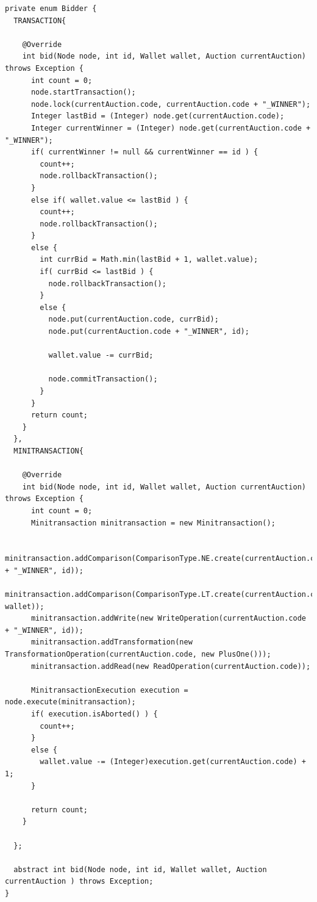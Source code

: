 \documentclass[11pt,twoside,a4paper]{book}
\begin{document}
\begin{lstlisting}[caption={Participante que efetuam os lances}, label=lst:bidder_auction]
private enum Bidder {
  TRANSACTION{

    @Override
    int bid(Node node, int id, Wallet wallet, Auction currentAuction) throws Exception {
      int count = 0;
      node.startTransaction();
      node.lock(currentAuction.code, currentAuction.code + "_WINNER");
      Integer lastBid = (Integer) node.get(currentAuction.code);
      Integer currentWinner = (Integer) node.get(currentAuction.code + "_WINNER");
      if( currentWinner != null && currentWinner == id ) {
        count++;
        node.rollbackTransaction();
      }
      else if( wallet.value <= lastBid ) {
        count++;
        node.rollbackTransaction();
      }
      else {
        int currBid = Math.min(lastBid + 1, wallet.value);
        if( currBid <= lastBid ) {
          node.rollbackTransaction();
        }
        else {
          node.put(currentAuction.code, currBid);
          node.put(currentAuction.code + "_WINNER", id);
                     
          wallet.value -= currBid;
                     
          node.commitTransaction();
        }
      }
      return count;
    } 
  },
  MINITRANSACTION{

    @Override
    int bid(Node node, int id, Wallet wallet, Auction currentAuction) throws Exception {
      int count = 0;
      Minitransaction minitransaction = new Minitransaction();
            
      minitransaction.addComparison(ComparisonType.NE.create(currentAuction.code + "_WINNER", id));
      minitransaction.addComparison(ComparisonType.LT.create(currentAuction.code, wallet));
      minitransaction.addWrite(new WriteOperation(currentAuction.code + "_WINNER", id));
      minitransaction.addTransformation(new TransformationOperation(currentAuction.code, new PlusOne()));
      minitransaction.addRead(new ReadOperation(currentAuction.code));
            
      MinitransactionExecution execution = node.execute(minitransaction);
      if( execution.isAborted() ) {
        count++;
      }
      else {
        wallet.value -= (Integer)execution.get(currentAuction.code) + 1;
      }
            
      return count;
    }
         
  };
      
  abstract int bid(Node node, int id, Wallet wallet, Auction currentAuction ) throws Exception;
}
\end{lstlisting}
\end{document}
